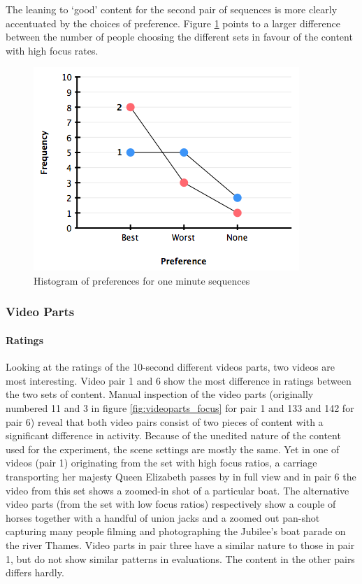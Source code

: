 The leaning to `good' content for the second pair of sequences is more clearly accentuated by the choices of preference. Figure \ref{fig:evalSeqsPref} points to a larger difference between the number of people choosing the different sets in favour of the content with high focus rates. 

\begin{figure}[htbp]
  \centering
    \includegraphics[width=.6\textwidth]{img/evaluation/pref_seqs_all}
  \caption{Histogram of preferences for one minute sequences}
  \label{fig:evalSeqsPref}
\end{figure}

\subsubsection{Video Parts}
\paragraph{Ratings}

Looking at the ratings of the 10-second different videos parts, two videos are most interesting. Video pair 1 and 6 show the most difference in ratings between the two sets of content. Manual inspection of the video parts (originally numbered 11 and 3 in figure \ref{fig:videoparts_focus} for pair 1 and 133 and 142 for pair 6) reveal that both video pairs consist of two pieces of content with a significant difference in activity. Because of the unedited nature of the content used for the experiment, the scene settings are mostly the same. Yet in one of videos (pair 1) originating from the set with high focus ratios, a carriage transporting her majesty Queen Elizabeth passes by in full view and in pair 6 the video from this set shows a zoomed-in shot of a particular boat. The alternative video parts (from the set with low focus ratios) respectively show a couple of horses together with a handful of union jacks and a zoomed out pan-shot capturing many people filming and photographing the Jubilee's boat parade on the river Thames. Video parts in pair three have a similar nature to those in pair 1, but do not show similar patterns in evaluations. The content in the other pairs differs hardly.

